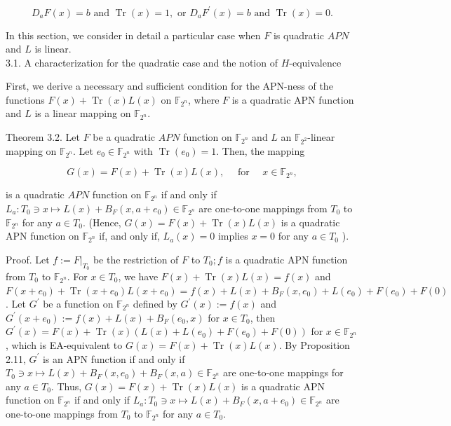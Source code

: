 \documentclass[10pt]{article}
\begin{document}
$$
D_{a} F(x)=b \text { and } \operatorname{Tr}(x)=1, \text { or } D_{a} F^{\prime}(x)=b \text { and } \operatorname{Tr}(x)=0 .
$$

In this section, we consider in detail a particular case when $F$ is quadratic $A P N$ and $L$ is linear.\\
3.1. A characterization for the quadratic case and the notion of $H$-equivalence

First, we derive a necessary and sufficient condition for the APN-ness of the functions $F(x)+\operatorname{Tr}(x) L(x)$ on $\mathbb{F}_{2^{n}}$, where $F$ is a quadratic APN function and $L$ is a linear mapping on $\mathbb{F}_{2^{n}}$.

Theorem 3.2. Let $F$ be a quadratic $A P N$ function on $\mathbb{F}_{2^{n}}$ and $L$ an $\mathbb{F}_{2^{2}}$-linear mapping on $\mathbb{F}_{2^{n}}$. Let $e_{0} \in \mathbb{F}_{2^{n}}$ with $\operatorname{Tr}\left(e_{0}\right)=1$. Then, the mapping

$$
G(x)=F(x)+\operatorname{Tr}(x) L(x), \quad \text { for } \quad x \in \mathbb{F}_{2^{n}},
$$

is a quadratic $A P N$ function on $\mathbb{F}_{2^{n}}$ if and only if $L_{a}: T_{0} \ni x \mapsto L(x)+B_{F}\left(x, a+e_{0}\right) \in \mathbb{F}_{2^{n}}$ are one-to-one mappings from $T_{0}$ to $\mathbb{F}_{2^{n}}$ for any $a \in T_{0}$. (Hence, $G(x)= F(x)+\operatorname{Tr}(x) L(x)$ is a quadratic APN function on $\mathbb{F}_{2^{n}}$ if, and only if, $L_{a}(x)=0$ implies $x=0$ for any $a \in T_{0}$ ).

Proof. Let $f:=\left.F\right|_{T_{0}}$ be the restriction of $F$ to $T_{0} ; f$ is a quadratic APN function from $T_{0}$ to $\mathbb{F}_{2^{n}}$. For $x \in T_{0}$, we have $F(x)+\operatorname{Tr}(x) L(x)=f(x)$ and $F\left(x+e_{0}\right)+ \operatorname{Tr}\left(x+e_{0}\right) L\left(x+e_{0}\right)=f(x)+L(x)+B_{F}\left(x, e_{0}\right)+L\left(e_{0}\right)+F\left(e_{0}\right)+F(0)$. Let $G^{\prime}$ be a function on $\mathbb{F}_{2^{n}}$ defined by $G^{\prime}(x):=f(x)$ and $G^{\prime}\left(x+e_{0}\right):=f(x)+L(x)+B_{F}\left(e_{0}, x\right)$ for $x \in T_{0}$, then $G^{\prime}(x)=F(x)+\operatorname{Tr}(x)\left(L(x)+L\left(e_{0}\right)+F\left(e_{0}\right)+F(0)\right)$ for $x \in \mathbb{F}_{2^{n}}$, which is EA-equivalent to $G(x)=F(x)+\operatorname{Tr}(x) L(x)$. By Proposition 2.11, $G^{\prime}$ is an APN function if and only if $T_{0} \ni x \mapsto L(x)+B_{F}\left(x, e_{0}\right)+B_{F}(x, a) \in \mathbb{F}_{2^{n}}$ are one-to-one mappings for any $a \in T_{0}$. Thus, $G(x)=F(x)+\operatorname{Tr}(x) L(x)$ is a quadratic APN function on $\mathbb{F}_{2^{n}}$ if and only if $L_{a}: T_{0} \ni x \mapsto L(x)+B_{F}\left(x, a+e_{0}\right) \in \mathbb{F}_{2^{n}}$ are one-to-one mappings from $T_{0}$ to $\mathbb{F}_{2^{n}}$ for any $a \in T_{0}$.
\end{document}
